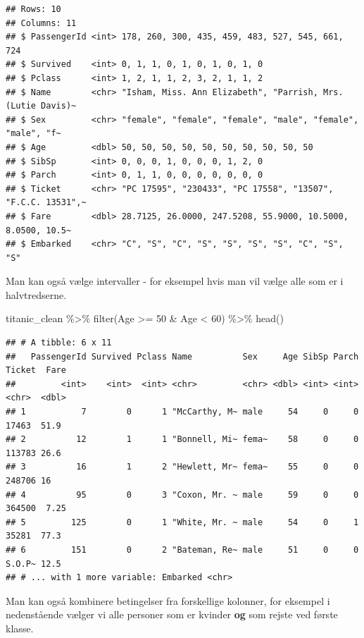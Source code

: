 \documentclass[
]{book}
\newenvironment{Shaded}{\begin{snugshade}}{\end{snugshade}}
\newcommand{\DecValTok}[1]{\textcolor[rgb]{0.00,0.00,0.81}{#1}}
\newcommand{\FunctionTok}[1]{\textcolor[rgb]{0.00,0.00,0.00}{#1}}
\newcommand{\NormalTok}[1]{#1}
\newcommand{\SpecialCharTok}[1]{\textcolor[rgb]{0.00,0.00,0.00}{#1}}
\begin{document}
\begin{verbatim}
## Rows: 10
## Columns: 11
## $ PassengerId <int> 178, 260, 300, 435, 459, 483, 527, 545, 661, 724
## $ Survived    <int> 0, 1, 1, 0, 1, 0, 1, 0, 1, 0
## $ Pclass      <int> 1, 2, 1, 1, 2, 3, 2, 1, 1, 2
## $ Name        <chr> "Isham, Miss. Ann Elizabeth", "Parrish, Mrs. (Lutie Davis)~
## $ Sex         <chr> "female", "female", "female", "male", "female", "male", "f~
## $ Age         <dbl> 50, 50, 50, 50, 50, 50, 50, 50, 50, 50
## $ SibSp       <int> 0, 0, 0, 1, 0, 0, 0, 1, 2, 0
## $ Parch       <int> 0, 1, 1, 0, 0, 0, 0, 0, 0, 0
## $ Ticket      <chr> "PC 17595", "230433", "PC 17558", "13507", "F.C.C. 13531",~
## $ Fare        <dbl> 28.7125, 26.0000, 247.5208, 55.9000, 10.5000, 8.0500, 10.5~
## $ Embarked    <chr> "C", "S", "C", "S", "S", "S", "S", "C", "S", "S"
\end{verbatim}

Man kan også vælge intervaller - for eksempel hvis man vil vælge alle som er i halvtredserne.

\begin{Shaded}
\begin{Highlighting}[]
\NormalTok{titanic\_clean }\SpecialCharTok{\%\textgreater{}\%} 
  \FunctionTok{filter}\NormalTok{(Age }\SpecialCharTok{\textgreater{}=} \DecValTok{50} \SpecialCharTok{\&}\NormalTok{ Age }\SpecialCharTok{\textless{}} \DecValTok{60}\NormalTok{) }\SpecialCharTok{\%\textgreater{}\%}
  \FunctionTok{head}\NormalTok{()}
\end{Highlighting}
\end{Shaded}

\begin{verbatim}
## # A tibble: 6 x 11
##   PassengerId Survived Pclass Name          Sex     Age SibSp Parch Ticket  Fare
##         <int>    <int>  <int> <chr>         <chr> <dbl> <int> <int> <chr>  <dbl>
## 1           7        0      1 "McCarthy, M~ male     54     0     0 17463  51.9 
## 2          12        1      1 "Bonnell, Mi~ fema~    58     0     0 113783 26.6 
## 3          16        1      2 "Hewlett, Mr~ fema~    55     0     0 248706 16   
## 4          95        0      3 "Coxon, Mr. ~ male     59     0     0 364500  7.25
## 5         125        0      1 "White, Mr. ~ male     54     0     1 35281  77.3 
## 6         151        0      2 "Bateman, Re~ male     51     0     0 S.O.P~ 12.5 
## # ... with 1 more variable: Embarked <chr>
\end{verbatim}

Man kan også kombinere betingelser fra forskellige kolonner, for eksempel i nedenstående vælger vi alle personer som er kvinder \textbf{og} som rejste ved første klasse.
\end{document}
